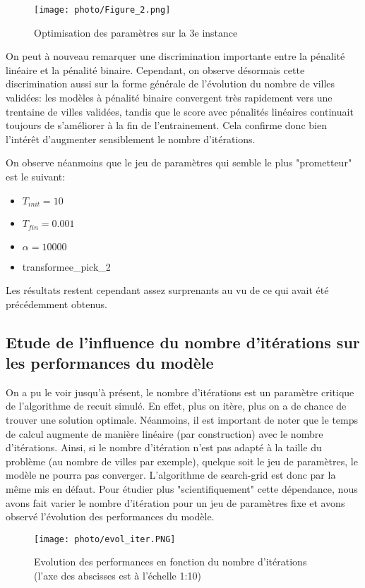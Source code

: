 \documentclass[a4paper, 12pt]{article}
\begin{document}
\begin{figure}[!h]
    \centering
    \texttt{[image: photo/Figure\_2.png]}
    \caption{Optimisation des paramètres sur la 3e instance}
    \label{fig:parametres_3}
\end{figure}

On peut à nouveau remarquer une discrimination importante entre la pénalité linéaire et la pénalité binaire. Cependant, on observe désormais cette discrimination aussi sur la forme générale de l'évolution du nombre de villes validées:
les modèles à pénalité binaire convergent très rapidement vers une trentaine de villes validées, tandis que le score avec pénalités linéaires continuait toujours de s'améliorer à la fin de l'entrainement.
Cela confirme donc bien l'intérêt d'augmenter sensiblement le nombre d'itérations.


On observe néanmoins que le jeu de paramètres qui semble le plus "prometteur" est le suivant:
\begin{itemize}
    \item $T_{init} = 10$
    \item $T_{fin} = 0.001$
    \item $\alpha = 10000$
    \item transformee\_pick\_2
\end{itemize}

Les résultats restent cependant assez surprenants au vu de ce qui avait été précédemment obtenus.


\subsection{Etude de l'influence du nombre d'itérations sur les performances du modèle}
On a pu le voir jusqu'à présent, le nombre d'itérations est un paramètre critique de l'algorithme de recuit simulé. En effet, plus on itère, plus on a de chance de trouver une solution optimale. Néanmoins, il est important de noter que le temps de calcul augmente de manière linéaire (par construction) avec le nombre d'itérations.
Ainsi, si le nombre d'itération n'est pas adapté à la taille du problème (au nombre de villes par exemple), quelque soit le jeu de paramètres, le modèle ne pourra pas converger. L'algorithme de search-grid est donc par la même mis en défaut.
Pour étudier plus "scientifiquement" cette dépendance, nous avons fait varier le nombre d'itération pour un jeu de paramètres fixe et avons observé l'évolution des performances du modèle.
\begin{figure}[!h]
    \centering
    \texttt{[image: photo/evol\_iter.PNG]}
    \caption{Evolution des performances en fonction du nombre d'itérations (l'axe des abscisses est à l'échelle 1:10)}
\end{figure}
\end{document}

